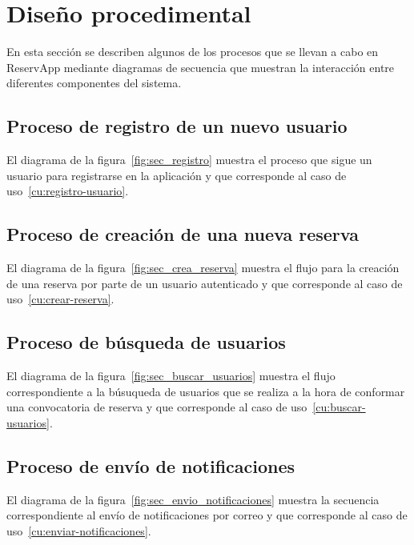\newpage

\section{Diseño procedimental}

En esta sección se describen algunos de los procesos que se llevan a cabo en ReservApp mediante diagramas de secuencia que muestran la interacción entre diferentes componentes del sistema.

\subsection{Proceso de registro de un nuevo usuario}

El diagrama de la figura~\ref{fig:sec_registro} muestra el proceso que sigue un usuario para registrarse en la aplicación y que corresponde al caso de uso~\ref{cu:registro-usuario}.


\newpage

\subsection{Proceso de creación de una nueva reserva}

El diagrama de la figura~\ref{fig:sec_crea_reserva} muestra el flujo para la creación de una reserva por parte de un usuario autenticado y que corresponde al caso de uso~\ref{cu:crear-reserva}.


\subsection{Proceso de búsqueda de usuarios}

El diagrama de la figura~\ref{fig:sec_buscar_usuarios} muestra el flujo correspondiente a la búsuqueda de usuarios que se realiza a la hora de conformar una convocatoria de reserva y que corresponde al caso de uso~\ref{cu:buscar-usuarios}.


\subsection{Proceso de envío de notificaciones}

El diagrama de la figura~\ref{fig:sec_envio_notificaciones} muestra la secuencia correspondiente al envío de notificaciones por correo y que corresponde al caso de uso~\ref{cu:enviar-notificaciones}.

